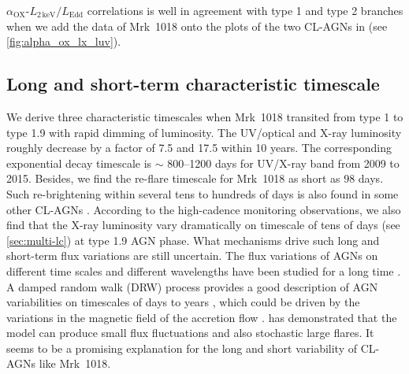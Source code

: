 \documentclass[twocolumn]{aastex63}
\newcommand{\alphaox}{$\alpha_\mathrm{OX}$}
\begin{document}
\alphaox-$L_\mathrm{2\,keV}/L_\mathrm{Edd}$ correlations is well in agreement with type 1 and type 2 branches when we add the data of Mrk~1018 onto the plots of the two CL-AGNs in \citet{2019arXiv190904676R} (see \autoref{fig:alpha_ox_lx_luv}).
 






\subsection{Long and short-term characteristic timescale}
We derive three characteristic timescales when Mrk~1018 transited from type 1 to type 1.9 with rapid dimming of luminosity. The UV/optical and X-ray luminosity roughly decrease by a factor of 7.5 and 17.5 within 10 years. The corresponding exponential decay timescale is $\sim$ 800--1200 days for UV/X-ray band from 2009 to 2015. Besides, we find the re-flare timescale for Mrk~1018 as short as 98 days. Such re-brightening within several tens to hundreds of days is also found in some other CL-AGNs \citep[e.g.][]{2017MNRAS.467.1496O,2020MNRAS.498..718O}. According to the high-cadence monitoring observations, we also find that the X-ray luminosity vary dramatically on timescale of tens of days (see \autoref{sec:multi-lc}) at type 1.9 AGN phase. What mechanisms drive such long and short-term flux variations are still uncertain. The flux variations of AGNs on different time scales and different wavelengths have been studied for a long time \citep[see reviews in ][]{1997ARA&A..35..445U}. A damped random walk (DRW) process provides a good description of AGN variabilities on timescales of days to years \citep[e.g.][]{2010ApJ...721.1014M,2011ApJ...730...52K}, which could be driven by the variations in the magnetic field of the accretion flow \citep{2004MNRAS.348..111K,2006MNRAS.368..379M,2007A&A...466..793J}. \citet{2004MNRAS.348..111K} has demonstrated that the model can produce small flux fluctuations and also stochastic large flares. It seems to be a promising explanation for the long and short variability of CL-AGNs like Mrk~1018. 
\end{document}
